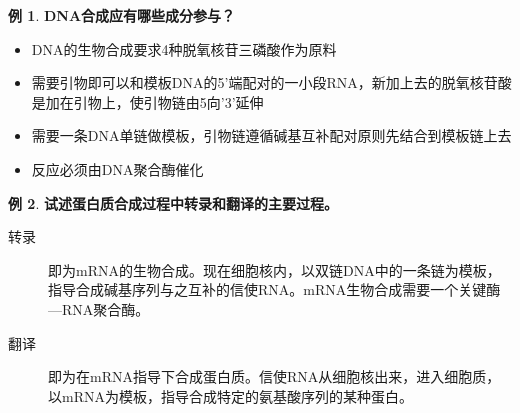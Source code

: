 \documentclass[UTF8]{article}
\theoremstyle{definition}
\newtheorem{example}{例}[section]
\begin{document}
\begin{example}\textbf{DNA合成应有哪些成分参与？}
    
    \begin{itemize}
        \item DNA的生物合成要求4种脱氧核苷三磷酸作为原料
        \item 需要引物即可以和模板DNA的5’端配对的一小段RNA，新加上去的脱氧核苷酸是加在引物上，使引物链由5向’3’延伸
        \item 需要一条DNA单链做模板，引物链遵循碱基互补配对原则先结合到模板链上去
        \item 反应必须由DNA聚合酶催化
    \end{itemize}
\end{example}\begin{example}\textbf{试述蛋白质合成过程中转录和翻译的主要过程。}
    
    \begin{description}
        \item[转录] 即为mRNA的生物合成。现在细胞核内，以双链DNA中的一条链为模板，指导合成碱基序列与之互补的信使RNA。mRNA生物合成需要一个关键酶---RNA聚合酶。
        \item[翻译] 即为在mRNA指导下合成蛋白质。信使RNA从细胞核出来，进入细胞质，以mRNA为模板，指导合成特定的氨基酸序列的某种蛋白。
    \end{description}
\end{example}
\end{document}
